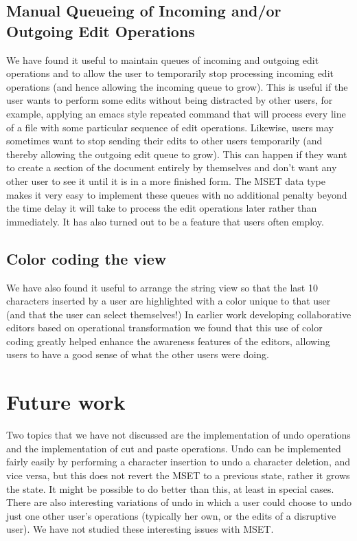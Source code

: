 \documentclass{amsart}
\begin{document}
\subsection{Manual Queueing of Incoming and/or Outgoing Edit Operations}
We have found it useful to maintain queues of incoming and outgoing edit operations
and to allow the user to temporarily stop processing incoming edit operations (and hence allowing the incoming queue to grow).  This is useful if the user wants to perform some edits without being distracted by other users, for example, applying an emacs style repeated command that will process every line of a file with some particular sequence of edit operations.  Likewise, users may sometimes want to stop sending their edits to other users temporarily (and thereby allowing the outgoing edit queue to grow).  This can happen if they want to create a section of the document entirely by themselves and don't want any other user to see it until it is in a more finished form.  The MSET data type makes it very easy to implement these queues with no additional penalty beyond the time delay it will take to process the edit operations later rather than immediately. It has also turned out to be a feature that users often employ.

\subsection{Color coding the view}
We have also found it useful to arrange the string view so that the last 10 characters inserted by a user are highlighted with a color unique to that user (and that the user can select themselves!)  In earlier work developing collaborative editors based on operational transformation we found that this use of color coding greatly helped enhance the awareness features of the editors, allowing users to have a good sense of what the other users were doing.

\section{Future work}
\label{future}
Two topics that we have not discussed are the implementation of undo operations
and the implementation of cut and paste operations.  Undo can be implemented fairly easily by performing a character insertion to undo a character deletion, and vice versa, but this does not revert the MSET to a previous state, rather it grows the state.  It might be possible to do better than this, at least in special cases. There are also interesting variations of undo in which a user could choose to undo just one other user's operations (typically her own, or the edits of a disruptive user).
We have not studied these interesting issues with MSET.
\end{document}
